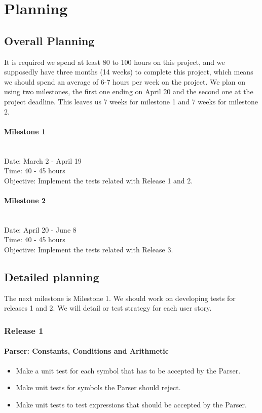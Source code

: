 \documentclass[pdftex,a4paper,11pt]{article}
\begin{document}
\section{Planning}
\subsection{Overall Planning}

It is required we spend at least 80 to 100 hours on this project, and we supposedly have three months (14 weeks) to complete this project, which means we should spend an average of 6-7 hours per week on the project. 
We plan on using two milestones, the first one ending on April 20 and the second one at the project deadline. This leaves us 7 weeks for milestone 1 and 7 weeks for milestone 2. 


\paragraph{Milestone 1} \mbox{}\\
Date: March 2 - April 19\\
Time: 40 - 45 hours\\
Objective: Implement the tests related with Release 1 and 2.

\paragraph{Milestone 2} \mbox{}\\
Date: April 20 - June 8\\
Time: 40 - 45 hours\\
Objective: Implement the tests related with Release 3.


\subsection{Detailed planning} 

The next milestone is Milestone 1. We should work on developing tests for releases 1 and 2. We will detail or test strategy for each user story.
\subsubsection{Release 1}

\paragraph{Parser: Constants, Conditions and Arithmetic}
\begin{itemize}
  \item Make a unit test for each symbol that has to be accepted by the Parser.
  \item Make unit tests for symbols the Parser should reject.
  \item Make unit tests to test expressions that should be accepted by the Parser.
\end{itemize}
\end{document}
